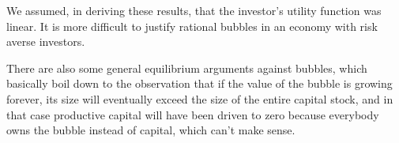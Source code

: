 \documentclass{handout}
\begin{document}
We assumed, in deriving these results, that the investor's utility function
was linear.  It is more difficult to justify rational bubbles in an 
economy with risk averse investors.  

There are also some general equilibrium arguments against bubbles, 
which basically boil down to the observation that if the value of the 
bubble is growing forever, its size will eventually exceed the size of 
the entire capital stock, and in that case productive capital will 
have been driven to zero because everybody owns the bubble instead of 
capital, which can't make sense.





 
\end{document}
